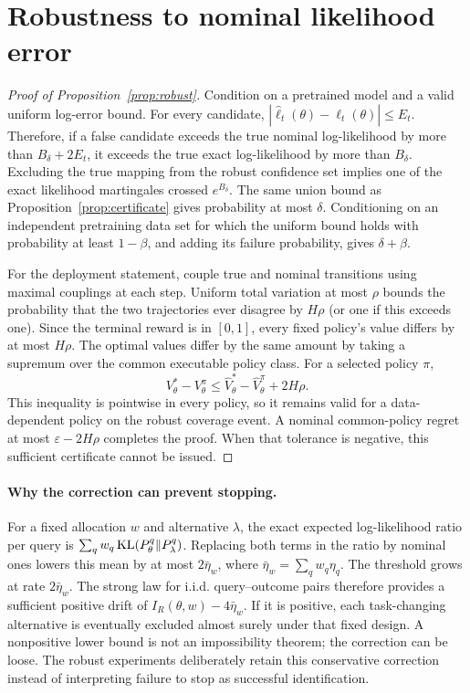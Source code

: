 \section{Robustness to nominal likelihood error}\label{app:robust}
\begin{proof}[Proof of Proposition~\ref{prop:robust}]
Condition on a pretrained model and a valid uniform log-error bound. For every candidate,
$|\widehat\ell_t(\theta)-\ell_t(\theta)|\le E_t$. Therefore, if a false candidate exceeds the true nominal log-likelihood by more than $B_\delta+2E_t$, it exceeds the true exact log-likelihood by more than $B_\delta$. Excluding the true mapping from the robust confidence set implies one of the exact likelihood martingales crossed $e^{B_\delta}$. The same union bound as Proposition~\ref{prop:certificate} gives probability at most $\delta$. Conditioning on an independent pretraining data set for which the uniform bound holds with probability at least $1-\beta$, and adding its failure probability, gives $\delta+\beta$.

For the deployment statement, couple true and nominal transitions using maximal couplings at each step. Uniform total variation at most $\rho$ bounds the probability that the two trajectories ever disagree by $H\rho$ (or one if this exceeds one). Since the terminal reward is in $[0,1]$, every fixed policy's value differs by at most $H\rho$. The optimal values differ by the same amount by taking a supremum over the common executable policy class. For a selected policy $\pi$,
\begin{equation}
V_\theta^*-V_\theta^\pi
\le\widehat V_\theta^*-\widehat V_\theta^\pi+2H\rho.
\end{equation}
This inequality is pointwise in every policy, so it remains valid for a data-dependent policy on the robust coverage event. A nominal common-policy regret at most $\varepsilon-2H\rho$ completes the proof. When that tolerance is negative, this sufficient certificate cannot be issued.
\end{proof}

\paragraph{Why the correction can prevent stopping.}
For a fixed allocation $w$ and alternative $\lambda$, the exact expected log-likelihood ratio per query is $\sum_qw_q\operatorname{KL}(P_\theta^q\Vert P_\lambda^q)$. Replacing both terms in the ratio by nominal ones lowers this mean by at most $2\bar\eta_w$, where $\bar\eta_w=\sum_qw_q\eta_q$. The threshold grows at rate $2\bar\eta_w$. The strong law for i.i.d. query--outcome pairs therefore provides a sufficient positive drift of $I_R(\theta,w)-4\bar\eta_w$. If it is positive, each task-changing alternative is eventually excluded almost surely under that fixed design. A nonpositive lower bound is not an impossibility theorem; the correction can be loose. The robust experiments deliberately retain this conservative correction instead of interpreting failure to stop as successful identification.
